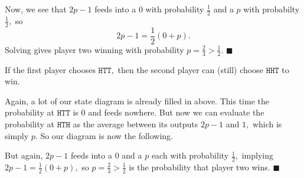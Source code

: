Now, we see that $2p-1$ feeds into a $0$ with probability $\frac12$ and a $p$ with probabilty $\frac12,$ so
\[2p-1=\frac12(0+p).\]
Solving gives player two winning with probability $p=\frac23>\frac12.$ $\blacksquare$

\begin{lemma}
    If the first player chooses $\texttt{HTT},$ then the second player can (still) choose $\texttt{HHT}$ to win.
\end{lemma}
Again, a lot of our state diagram is already filled in above. This time the probability at $\texttt{HTT}$ is $0$ and feeds nowhere. But now we can evaluate the probability at $\texttt{HTH}$ as the average between its outputs $2p-1$ and $1,$ which is simply $p.$ So our diagram is now the following.
\begin{center}
\end{center}
But again, $2p-1$ feeds into a $0$ and a $p$ each with probability $\frac12,$ implying $2p-1=\frac12(0+p),$ so $p=\frac23>\frac12$ is the probability that player two wins. $\blacksquare$

